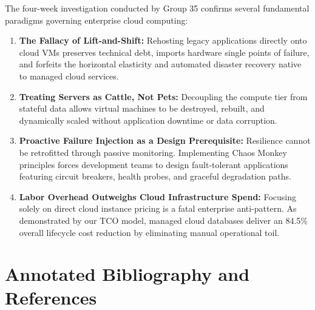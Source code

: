 \documentclass[11pt,a4paper]{article}
\begin{document}
The four-week investigation conducted by Group 35 confirms several fundamental paradigms governing enterprise cloud computing:
\begin{enumerate}[leftmargin=*]
    \item \textbf{The Fallacy of Lift-and-Shift:} Rehosting legacy applications directly onto cloud VMs preserves technical debt, imports hardware single points of failure, and forfeits the horizontal elasticity and automated disaster recovery native to managed cloud services.
    \item \textbf{Treating Servers as Cattle, Not Pets:} Decoupling the compute tier from stateful data allows virtual machines to be destroyed, rebuilt, and dynamically scaled without application downtime or data corruption.
    \item \textbf{Proactive Failure Injection as a Design Prerequisite:} Resilience cannot be retrofitted through passive monitoring. Implementing Chaos Monkey principles forces development teams to design fault-tolerant applications featuring circuit breakers, health probes, and graceful degradation paths.
    \item \textbf{Labor Overhead Outweighs Cloud Infrastructure Spend:} Focusing solely on direct cloud instance pricing is a fatal enterprise anti-pattern. As demonstrated by our TCO model, managed cloud databases deliver an 84.5\% overall lifecycle cost reduction by eliminating manual operational toil.
\end{enumerate}

\section{Annotated Bibliography and References}
\end{document}
